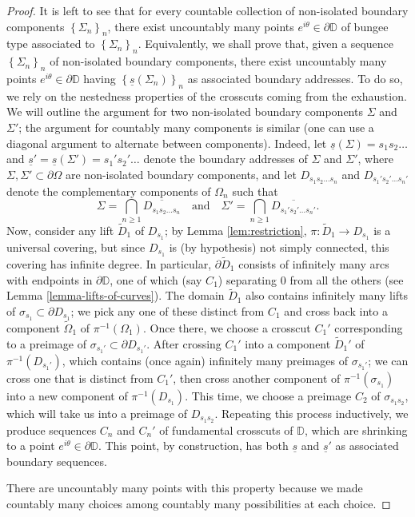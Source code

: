 \documentclass[10pt,a4paper]{amsart}
\def\DD{\mathbb{D}}
\renewcommand{\tilde}{\widetilde}
\begin{document}
\begin{proof}
	It is left to see that for every countable collection of non-isolated boundary components $ \left\lbrace \Sigma_n \right\rbrace _n$, there exist uncountably many  points $ e^{i\theta}\in\partial\mathbb{D} $ of bungee type associated to $ \left\lbrace \Sigma_n \right\rbrace _n$. Equivalently, we shall prove that, given a sequence $ \left\lbrace \Sigma_n \right\rbrace _n$ of non-isolated boundary components, there exist uncountably many points $ e^{i\theta}\in\partial\mathbb{D} $ having $ \left\lbrace \underline{s}(\Sigma_n) \right\rbrace _n$ as associated boundary addresses. To do so, we rely on the nestedness properties of the crosscuts coming from the exhaustion. We will outline the argument for two non-isolated boundary components $\Sigma$ and $\Sigma'$; the argument for countably many components is similar (one can use a diagonal argument to alternate between components). Indeed, let $\underline{s}(\Sigma) = s_1s_2\dots$ and $\underline{s}'=\underline{s}(\Sigma') = s_1's_2'\dots$ denote the boundary addresses of $\Sigma$ and $\Sigma'$, where $\Sigma, \Sigma'\subset\partial\Omega$ are non-isolated boundary components, and let $D_{s_1s_2\dots s_n}$ and $D_{s_1's_2'\dots s_n'}$ denote the complementary components of $\Omega_n$ such that
	\[ \Sigma = \bigcap_{n\geq 1} \overline{D_{s_1s_2\dots s_n}} \  \ \ \text{ and } \ \ \  \Sigma' = \bigcap_{n\geq 1} \overline{D_{s_1's_2'\dots s_n'}}. \]
	Now, consider any lift $\tilde D_1$ of $D_{s_1}$; by Lemma \ref{lem:restriction}, $\pi\colon\tilde D_1\to D_{s_1}$ is a universal covering, but since $D_{s_1}$ is (by hypothesis) not simply connected, this covering has infinite degree. In particular, $\partial\tilde D_1$ consists of infinitely many arcs with endpoints in $\partial\DD$, one of which (say $C_1$) separating $0$ from all the others (see Lemma \ref{lemma-lifts-of-curves}). The domain $\tilde D_1$ also contains infinitely many lifts of $\sigma_{s_1}\subset\partial D_{s_1}$; we pick any one of these distinct from $C_1$ and cross back into a component $\tilde \Omega_1$ of $\pi^{-1}(\Omega_1)$. Once there, we choose a crosscut $C_1'$ corresponding to a preimage of $\sigma_{s_1'}\subset \partial  D_{s_1'}$. After crossing $C_1'$ into a component $\tilde D_1'$ of $\pi^{-1}(D_{s_1'})$, which contains (once again) infinitely many preimages of $\sigma_{s_1'}$; we can cross one that is distinct from $C_1'$, then cross another component of $\pi^{-1}(\sigma_{s_1})$ into a new component of $\pi^{-1}(D_{s_1})$. This time, we choose a preimage $C_2$ of $\sigma_{s_1s_2}$, which will take us into a preimage of $D_{s_1s_2}$. Repeating this process inductively, we produce sequences $C_n$ and $C_n'$ of fundamental crosscuts of $\DD$, which are shrinking to a point $e^{i\theta}\in\partial\DD$. This point, by construction, has both $\underline{s}$ and $\underline{s}'$ as associated boundary sequences.

	There are uncountably many points with this property because we made countably many choices among countably many possibilities at each choice.
\end{proof}
\end{document}
